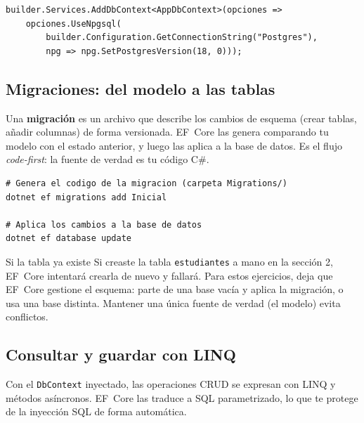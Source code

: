 \documentclass[11pt]{article}
\begin{document}
\begin{cajacodigo}
\begin{lstlisting}[style=cs]
builder.Services.AddDbContext<AppDbContext>(opciones =>
    opciones.UseNpgsql(
        builder.Configuration.GetConnectionString("Postgres"),
        npg => npg.SetPostgresVersion(18, 0)));
\end{lstlisting}
\end{cajacodigo}

\subsection{Migraciones: del modelo a las tablas}
Una \textbf{migración} es un archivo que describe los cambios de esquema (crear tablas, añadir columnas) de forma versionada. EF~Core las genera comparando tu modelo con el estado anterior, y luego las aplica a la base de datos. Es el flujo \emph{code-first}: la fuente de verdad es tu código C\#.

\begin{cajacodigo}
\begin{lstlisting}[style=shell]
# Genera el codigo de la migracion (carpeta Migrations/)
dotnet ef migrations add Inicial

# Aplica los cambios a la base de datos
dotnet ef database update
\end{lstlisting}
\end{cajacodigo}
\vspace{2pt}
\begin{cajatip}{Si la tabla ya existe}
Si creaste la tabla \texttt{estudiantes} a mano en la sección 2, EF~Core intentará crearla de nuevo y fallará. Para estos ejercicios, deja que EF~Core gestione el esquema: parte de una base vacía y aplica la migración, o usa una base distinta. Mantener una única fuente de verdad (el modelo) evita conflictos.\par
\end{cajatip}

\subsection{Consultar y guardar con LINQ}
Con el \texttt{DbContext} inyectado, las operaciones CRUD se expresan con LINQ y métodos asíncronos. EF~Core las traduce a SQL parametrizado, lo que te protege de la inyección SQL de forma automática.
\end{document}
